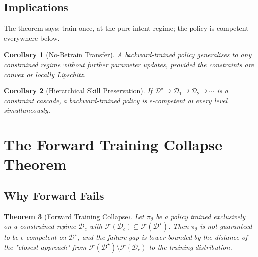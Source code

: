 \documentclass[11pt,twocolumn,a4paper]{article}
\newtheorem{theorem}{Theorem}[section]
\newtheorem{corollary}[theorem]{Corollary}
\newcommand{\cF}{\mathcal{F}}
\newcommand{\cD}{\mathcal{D}}
\begin{document}
\subsection{Implications}

The theorem says: train once, at the pure-intent regime; the policy is competent everywhere below.

\begin{corollary}[No-Retrain Transfer]
\label{cor:no-retrain}
A backward-trained policy generalises to any constrained regime without further parameter updates, provided the constraints are convex or locally Lipschitz.
\end{corollary}

\begin{corollary}[Hierarchical Skill Preservation]
\label{cor:hierarchy}
If $\cD^\star \supseteq \cD_1 \supseteq \cD_2 \supseteq \cdots$ is a constraint cascade, a backward-trained policy is $\epsilon$-competent at every level simultaneously.
\end{corollary}


\section{The Forward Training Collapse Theorem}
\label{sec:collapse}

\subsection{Why Forward Fails}

\begin{theorem}[Forward Training Collapse]
\label{thm:forward-collapse}
Let $\pi_\theta$ be a policy trained exclusively on a constrained regime $\cD_c$ with $\cF(\cD_c) \subsetneq \cF(\cD^\star)$. Then $\pi_\theta$ is not guaranteed to be $\epsilon$-competent on $\cD^\star$, and the failure gap is lower-bounded by the distance of the "closest approach" from $\cF(\cD^\star) \setminus \cF(\cD_c)$ to the training distribution.
\end{theorem}
\end{document}
